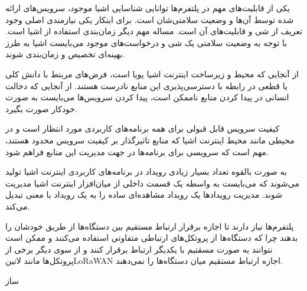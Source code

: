 \documentclass[]{./reports}
\begin{document}

یکی از قابلیت‌های مهم در پلتفرم‌ها توانایی شناسایی اشیا موجود، سرویس‌های ارائه شده توسط آن‌ها و وضعیت سلامتی‌شان است.
برای اینکار یکی نیازمندی اصلی وجود تعریف از شی و قابلیت‌های آن است.
مساله مهم دیگر زمان‌بندی استفاده از اشیا است. با توجه به وضعیت سلامتی یک شی و درخواست‌های موجود می‌بایست اشیا
به طرز بهینه‌ای تخصیص و زمان‌بندی شوند.

از آنجایی که محیط و زیرساخت اینترنت اشیا پویا است، فرض‌های مربتط با دانش کلی یا قطعی در رابطه با دسترسی‌پذیری این
منابع نادرست هستند.
از آنجایی که دخالت انسانی در پیدا کردن منابع ناممکن است، پیدا کردن سرویس‌ها می‌بایست به صورت خودکار صورت بگیرد.


کیفیت سرویس قابل قبولی برای همه برنامه‌های کاربردی مورد انتظار است و در محیطی مانند محیط اینترنت اشیا که منابع تاثیرگذار بر کیفیت سرویس
محدود هستند، مهم است که سرویسی برای برنامه‌ها در جهت مدیریت این منابع فراهم شود.


به صورت بالقوه تعداد بسیار زیادی رویداد در برنامه‌های کاربردی اینترنت اشیا تولید می‌شوند
که می‌بایست به واسطه یک قسمت داخلی از میان‌افزار اینترنت اشیا مدیریت شوند.
مدیریت رویدادها یک رویداد مشاهده‌ای ساده را به یک رویداد با معنی تبدیل می‌کند.


پلتفرم‌ها نیاز دارند تا اجازه برقرار ارتباط مستقیم بین دستگاه‌ها از طریق خودشان را بدهند چرا که دستگاه‌ها از پروتکل‌های ارتباطی متفاوتی استفاده می‌کنند
و ممکن است نتوانند به صورت مسقتیم با یکدیگر ارتباط برقرار کنند و از سوی دیگر برخی از پروتکل‌ها مانند ‌لاتین{LoRaWAN} اجازه ارتباط مستقیم میان
دستگاه‌ها را نمی‌دهند.


‌ساز
\end{document}
